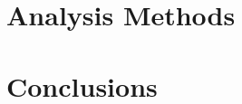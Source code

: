 \documentclass[openany, oneside, 12pt]{book}
\begin{document}
\chapter{Analysis Methods}


\chapter{Conclusions}



% 

% 

%  



\end{document}
